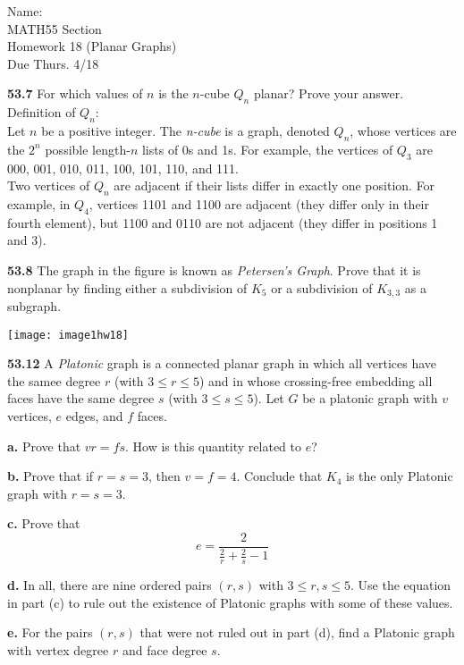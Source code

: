 \documentclass[10pt]{article}
\begin{document}
\begin{flushright}
    Name: \underline{\hspace{3cm}} \\
        MATH55 Section \underline{\hspace{0.5cm}} \\
        Homework 18 (Planar Graphs) \\
	Due Thurs. 4/18
\end{flushright}

\begin{framed}
    \textbf{53.7} For which values of $n$ is the $n$-cube $Q_n$ planar? Prove
    your answer.\\

    Definition of $Q_n$:\\
    Let $n$ be a positive integer. The \textit{n-cube} is a graph, denoted $Q_n$,
    whose vertices are the $2^n$ possible length-$n$ lists of 0s and 1s. For
    example, the vertices of $Q_3$ are 000, 001, 010, 011, 100, 101, 110, and
    111.\\
    Two vertices of $Q_n$ are adjacent if their lists differ in exactly one
    position. For example, in $Q_4$, vertices 1101 and 1100 are adjacent
    (they differ only in their fourth element), but 1100 and 0110 are not
    adjacent (they differ in positions 1 and 3).
\end{framed}

\pagebreak

\begin{framed}
    \textbf{53.8} The graph in the figure is known as \textit{Petersen's
    Graph}. Prove that it is nonplanar by finding either a subdivision of
    $K_5$ or a subdivision of $K_{3,3}$ as a subgraph.

    \texttt{[image: image1hw18]}
\end{framed}

\pagebreak

\begin{framed}
    \textbf{53.12} A \textit{Platonic} graph is a connected planar graph
    in which all vertices have the samee degree $r$ (with $3 \leq r \leq 5$)
    and in whose crossing-free embedding all faces have the same degree $s$
    (with $3 \leq s \leq 5$). Let $G$ be a platonic graph with $v$ vertices,
    $e$ edges, and $f$ faces.

    \textbf{a.} Prove that $vr=fs$. How is this quantity related to $e$?

    \textbf{b.} Prove that if $r=s=3$, then $v=f=4$. Conclude that $K_4$ is
    the only Platonic graph with $r=s=3$.

    \textbf{c.} Prove that
    \[e = \frac{2}{\frac{2}{r} + \frac{2}{s} - 1}\]

    \textbf{d.} In all, there are nine ordered pairs $(r, s)$ with
    $3 \leq r, s \leq 5$. Use the equation in part (c) to rule out
    the existence of Platonic graphs with some of these values.

    \textbf{e.} For the pairs $(r, s)$ that were not ruled out in part (d),
    find a Platonic graph with vertex degree $r$ and face degree $s$.
\end{framed}
\end{document}
